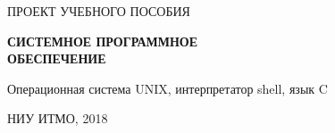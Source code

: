 \begin{titlepage}
	\Large ПРОЕКТ УЧЕБНОГО ПОСОБИЯ
	
	\vspace {4cm}
	
	\Huge\textbf{{\fontsize{30}{30}\selectfont 
	СИСТЕМНОЕ ПРОГРАММНОЕ
	\\
	ОБЕСПЕЧЕНИЕ}}
	
	\vspace{0.5cm}
	{\large Операционная система UNIX, интерпретатор shell, язык C \par}
	


	\vfill
	{\large НИУ ИТМО, 2018}
	
\end{titlepage}